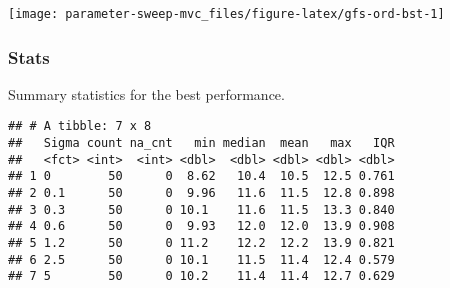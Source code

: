 \documentclass[]{book}
\newenvironment{Shaded}{\begin{snugshade}}{\end{snugshade}}
\newcommand{\DataTypeTok}[1]{\textcolor[rgb]{0.13,0.29,0.53}{#1}}
\newcommand{\KeywordTok}[1]{\textcolor[rgb]{0.13,0.29,0.53}{\textbf{#1}}}
\newcommand{\NormalTok}[1]{#1}
\newcommand{\OperatorTok}[1]{\textcolor[rgb]{0.81,0.36,0.00}{\textbf{#1}}}
\newcommand{\OtherTok}[1]{\textcolor[rgb]{0.56,0.35,0.01}{#1}}
\newcommand{\StringTok}[1]{\textcolor[rgb]{0.31,0.60,0.02}{#1}}
\begin{document}
\texttt{[image: parameter-sweep-mvc\_files/figure-latex/gfs-ord-bst-1]}

\hypertarget{stats-22}{%
\subsubsection{Stats}\label{stats-22}}

Summary statistics for the best performance.

\begin{Shaded}
\end{Shaded}

\begin{verbatim}
## # A tibble: 7 x 8
##   Sigma count na_cnt   min median  mean   max   IQR
##   <fct> <int>  <int> <dbl>  <dbl> <dbl> <dbl> <dbl>
## 1 0        50      0  8.62   10.4  10.5  12.5 0.761
## 2 0.1      50      0  9.96   11.6  11.5  12.8 0.898
## 3 0.3      50      0 10.1    11.6  11.5  13.3 0.840
## 4 0.6      50      0  9.93   12.0  12.0  13.9 0.908
## 5 1.2      50      0 11.2    12.2  12.2  13.9 0.821
## 6 2.5      50      0 10.1    11.5  11.4  12.4 0.579
## 7 5        50      0 10.2    11.4  11.4  12.7 0.629
\end{verbatim}
\end{document}
